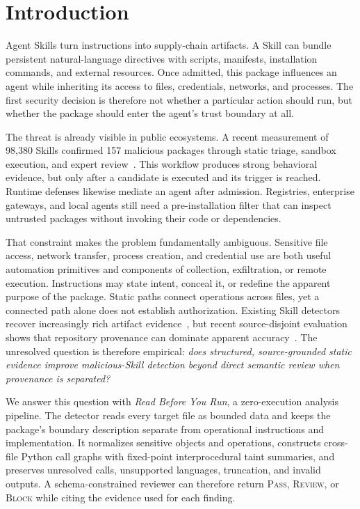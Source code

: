 \section{Introduction}
\label{sec:introduction}

Agent Skills turn instructions into supply-chain artifacts. A Skill can bundle
persistent natural-language directives with scripts, manifests, installation
commands, and external resources. Once admitted, this package influences an
agent while inheriting its access to files, credentials, networks, and
processes. The first security decision is therefore not whether a particular
action should run, but whether the package should enter the agent's trust
boundary at all.

The threat is already visible in public ecosystems. A recent measurement of
98,380 Skills confirmed 157 malicious packages through static triage, sandbox
execution, and expert review~\cite{liu2026maliciousskills}. This workflow
produces strong behavioral evidence, but only after a candidate is executed and
its trigger is reached. Runtime defenses likewise mediate an agent after
admission. Registries, enterprise gateways, and local agents still need a
pre-installation filter that can inspect untrusted packages without invoking
their code or dependencies.

That constraint makes the problem fundamentally ambiguous. Sensitive file
access, network transfer, process creation, and credential use are both useful
automation primitives and components of collection, exfiltration, or remote
execution. Instructions may state intent, conceal it, or redefine the apparent
purpose of the package. Static paths connect operations across files, yet a
connected path alone does not establish authorization. Existing Skill
detectors recover increasingly rich artifact evidence~\cite{wang2026malskills},
but recent source-disjoint evaluation shows that repository provenance can
dominate apparent accuracy~\cite{wang2026maliciousskillbench}. The unresolved
question is therefore empirical: \emph{does structured, source-grounded static
evidence improve malicious-Skill detection beyond direct semantic review when
provenance is separated?}

We answer this question with \emph{Read Before You Run}, a zero-execution
analysis pipeline. The detector reads every target file as bounded data and
keeps the package's boundary description separate from operational
instructions and implementation. It normalizes sensitive objects and
operations, constructs cross-file Python call graphs with fixed-point
interprocedural taint summaries, and preserves unresolved calls, unsupported
languages, truncation, and invalid outputs. A schema-constrained reviewer can
therefore return \textsc{Pass}, \textsc{Review}, or \textsc{Block} while citing
the evidence used for each finding.

